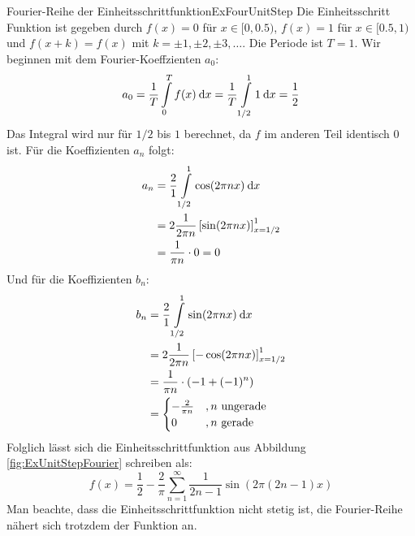 \begin{example}{Fourier-Reihe der Einheitsschrittfunktion}{ExFourUnitStep}
    Die Einheitsschritt Funktion ist gegeben durch $f(x) = 0$ für $x \in [0, 0.5)$, $f(x) = 1$ für $x \in [0.5, 1)$ und $f(x+k) = f(x)$ mit $k=\pm 1,\pm 2, \pm 3, \dots$. Die Periode ist $T=1$. Wir beginnen mit dem Fourier-Koeffzienten $a_0$:
    $$
        a_0 = \frac{1}{T} \int\limits_0^{T} f(x) \:\mathrm{d}{x} = \frac{1}{T} \int\limits_{1/2}^{1} 1 \:\mathrm{d}{x} = \frac{1}{2}
    $$
    Das Integral wird nur für $1/2$ bis $1$ berechnet, da $f$ im anderen Teil identisch $0$ ist. Für die Koeffizienten $a_n$ folgt:
    \begin{alignat*}{1}
        a_n &= \frac{2}{1} \int\limits_{1/2}^{1} \cos(2\pi n x) \:\mathrm{d}{x} \\
            &= 2 \frac{1}{2 \pi n} \left[ \sin(2\pi n x) \right]_{x=1/2}^1 \\
            &= \frac{1}{\pi n} \cdot 0 = 0
    \end{alignat*}
    Und für die Koeffizienten $b_n$:
    \begin{alignat*}{1}
        b_n &= \frac{2}{1} \int\limits_{1/2}^{1} \sin(2\pi n x) \:\mathrm{d}{x} \\
            &= 2 \frac{1}{2 \pi n} \left[ -\cos(2\pi n x) \right]_{x=1/2}^1 \\
            &= \frac{1}{\pi n} \cdot (-1+(-1)^n) \\
            &= \begin{cases} -\frac{2}{\pi n} & , n \text{ ungerade} \\ 0 &, n \text{ gerade} \end{cases}
    \end{alignat*}
    Folglich lässt sich die Einheitsschrittfunktion aus Abbildung \ref{fig:ExUnitStepFourier} schreiben als:
    $$
        f(x) = \frac{1}{2} - \frac{2}{\pi} \sum\limits_{n=1}^\infty \frac{1}{2n-1} \sin(2\pi (2n-1) x)
    $$
    Man beachte, dass die Einheitsschrittfunktion nicht stetig ist, die Fourier-Reihe nähert sich trotzdem der Funktion an.
\end{example}

